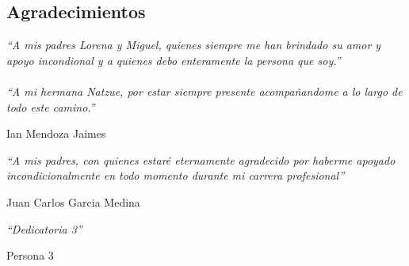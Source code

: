 
\begin{comment}
\begin{acknowledgements}

También quisiera reconocer a ... por ...CONACYT,  PAPIIT / etc.
\end{acknowledgements}
\end{comment}

\begin{alwayssingle}
	{
		\pagestyle{empty}
		\vspace{1.5cm}
		{\chapter*{Agradecimientos}
			\noindent 
			\textit{``A mis padres Lorena y Miguel, quienes siempre me han brindado su amor y apoyo incondional y a quienes debo enteramente la persona que soy.''} \\
			\\
			\textit{``A mi hermana Natzue, por estar siempre presente acompañandome a lo largo de todo este camino.''}
			\begin{flushright}
				Ian Mendoza Jaimes
			\end{flushright}
			\noindent 
			\textit{``A mis padres, con quienes estaré eternamente agradecido por haberme apoyado incondicionalmente en todo momento durante mi carrera profesional'' }
			\begin{flushright}
				Juan Carlos Garcia Medina
			\end{flushright}
			\noindent 
			\textit{``Dedicatoria 3''}
			\begin{flushright}
				Persona 3
			\end{flushright}
			
		}
	}
	
\end{alwayssingle}



